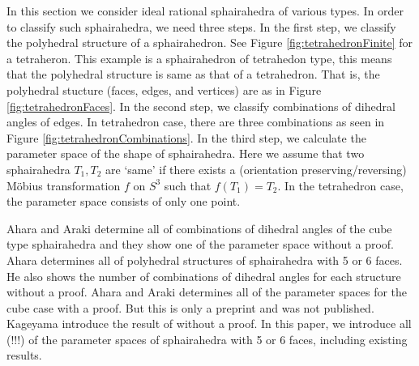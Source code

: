 \documentclass[suppldata, dvipdfmx]{interact}
\theoremstyle{plain}%
\theoremstyle{definition}
\theoremstyle{remark}
\theoremstyle{problemstyle}
\newtheorem{problem}{Problem}[section] %
\begin{document}


In this section we consider ideal rational sphairahedra of various types. 
In order to classify such sphairahedra, we need three steps.  In the first step, we classify the polyhedral structure of a sphairahedron.  See Figure \ref{fig:tetrahedronFinite} for a tetraheron.  This example is a sphairahedron of tetrahedon type, this means that the polyhedral structure is same as that of a tetrahedron.  That is, the polyhedral stucture (faces, edges, and vertices) are as in Figure \ref{fig:tetrahedronFaces}.  In the second step, we classify combinations of dihedral angles of edges.  In tetrahedron case, there are three combinations as seen in Figure \ref{fig:tetrahedronCombinations}.  In the third step, we calculate the parameter space of the shape of sphairahedra.  Here we assume that two sphairahedra $T_1, T_2$ are `same' if there exists a (orientation preserving/reversing) M\"obius transformation $f$ on $S^3$ such that $f(T_1) = T_2$.  In the tetrahedron case, the parameter space consists of only one point.  

Ahara and Araki \cite{AharaAraki} determine all of combinations of dihedral angles of the cube type sphairahedra and they show one of the parameter space without a proof.  
Ahara \cite{AharaJa} determines all of polyhedral structures of sphairahedra with 5 or 6 faces.  He also shows the number of combinations of dihedral angles for each structure without a proof.  
Ahara and Araki \cite{AharaAraki2} determines all of the parameter spaces for the cube case with a proof.  But this is only a preprint and was not published.
Kageyama \cite{kageyama} introduce the result of \cite{AharaAraki2} without a proof. 
In this paper, we introduce all (!!!) of the parameter spaces of sphairahedra with 5 or 6 faces, including existing results.
 
\end{document}
